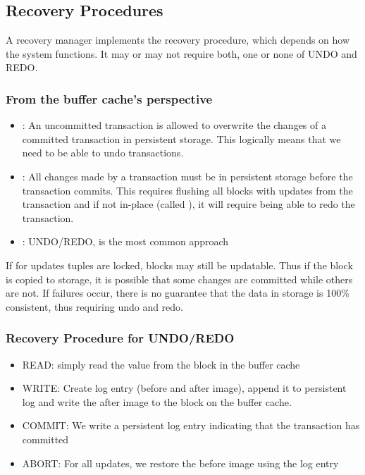 \newpage
\subsection{Recovery Procedures}
 A recovery manager implements the recovery procedure, which depends on how the system functions.
It may or may not require both, one or none of UNDO and REDO.

\subsubsection{From the buffer cache's perspective}
\begin{itemize}
    \item {}: An uncommitted transaction is allowed to overwrite the changes of a committed transaction in persistent storage.
          This logically means that we need to be able to undo transactions.
    \item {}: All changes made by a transaction must be in persistent storage before the transaction commits.
          This requires flushing all blocks with updates from the transaction and if not in-place (called ), it will require being able to redo the transaction.
    \item {}: UNDO/REDO, is the most common approach
\end{itemize}
If for updates tuples are locked, blocks may still be updatable.
Thus if the block is copied to storage, it is possible that some changes are committed while others are not.
If failures occur, there is no guarantee that the data in storage is 100\% consistent, thus requiring undo and redo.

\subsubsection{Recovery Procedure for UNDO/REDO}
\begin{itemize}
    \item READ: simply read the value from the block in the buffer cache
    \item WRITE: Create log entry (before and after image), append it to persistent log and write the after image to the block on the buffer cache.
    \item COMMIT: We write a persistent log entry indicating that the transaction has committed
    \item ABORT: For all updates, we restore the before image using the log entry
\end{itemize}

